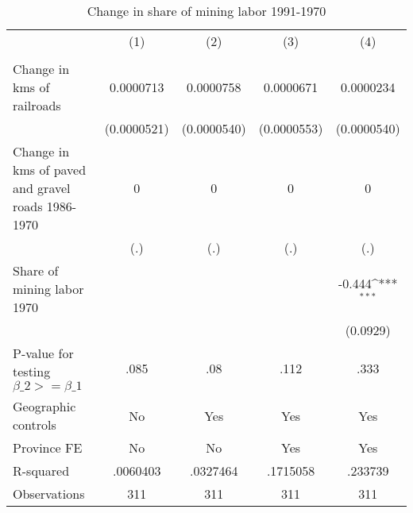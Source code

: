\begin{table}[htbp]\centering
\def\sym#1{\ifmmode^{#1}\else\(^{#1}\)\fi}
\caption{Change in share of mining labor 1991-1970}
\begin{tabular}{l*{4}{c}}
\hline\hline
                &\multicolumn{1}{c}{(1)}&\multicolumn{1}{c}{(2)}&\multicolumn{1}{c}{(3)}&\multicolumn{1}{c}{(4)}\\
                &\multicolumn{1}{c}{}&\multicolumn{1}{c}{}&\multicolumn{1}{c}{}&\multicolumn{1}{c}{}\\
\hline
Change in kms of railroads&0.0000713         &0.0000758         &0.0000671         &0.0000234         \\
                &(0.0000521)         &(0.0000540)         &(0.0000553)         &(0.0000540)         \\
[1em]
Change in kms of paved and gravel roads 1986-1970&        0         &        0         &        0         &        0         \\
                &      (.)         &      (.)         &      (.)         &      (.)         \\
[1em]
Share of mining labor 1970&                  &                  &                  &   -0.444\sym{***}\\
                &                  &                  &                  & (0.0929)         \\
\hline
P-value for testing $\beta\_{2} >= \beta\_{1}$&     .085         &      .08         &     .112         &     .333         \\
Geographic controls&       No         &      Yes         &      Yes         &      Yes         \\
Province FE     &       No         &       No         &      Yes         &      Yes         \\
R-squared       & .0060403         & .0327464         & .1715058         &  .233739         \\
Observations    &      311         &      311         &      311         &      311         \\
\hline\hline
\end{tabular}
\end{table}
